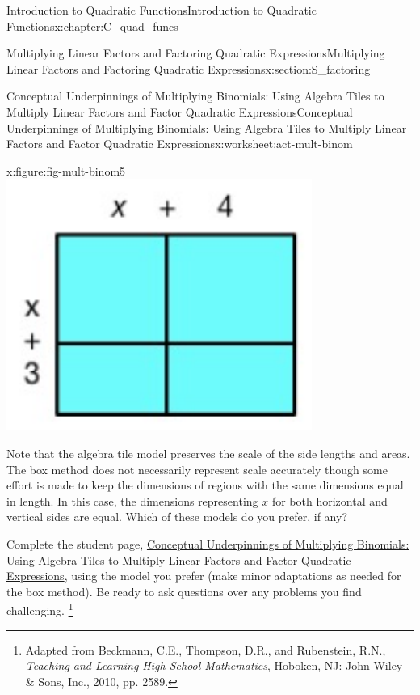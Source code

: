 \documentclass[oneside,10pt,]{book}
\newcommand{\pubtitle}[1]{\textsl{#1}}
\numberwithin{equation}{chapter}
\begin{document}
\begin{chapterptx}{Introduction to Quadratic Functions}{}{Introduction to Quadratic Functions}{}{}{x:chapter:C_quad_funcs}
\begin{sectionptx}{Multiplying Linear Factors and Factoring Quadratic Expressions}{}{Multiplying Linear Factors and Factoring Quadratic Expressions}{}{}{x:section:S_factoring}
\begin{worksheet-subsection}{Conceptual Underpinnings of Multiplying Binomials: Using Algebra Tiles to Multiply Linear Factors and Factor Quadratic Expressions}{}{Conceptual Underpinnings of Multiplying Binomials: Using Algebra Tiles to Multiply Linear Factors and Factor Quadratic Expressions}{}{}{x:worksheet:act-mult-binom}
\begin{introduction}{}
\begin{sidebyside}{2}{0}{0}{0}
\begin{sbspanel}{0.5}
\begin{figureptx}{}{x:figure:fig-mult-binom5}{}
\includegraphics[width=\linewidth]{external/mult-binom5.pdf}
\tcblower
\end{figureptx}%
\end{sbspanel}%
\end{sidebyside}%
%
\par
Note that the algebra tile model preserves the scale of the side lengths and areas. The box method does not necessarily represent scale accurately though some effort is made to keep the dimensions of regions with the same dimensions equal in length. In this case, the dimensions representing \(x\) for both horizontal and vertical sides are equal. Which of these models do you prefer, if any?%
\par
Complete the student page, \hyperref[x:worksheet:act-mult-binom]{Conceptual Underpinnings of Multiplying Binomials: Using Algebra Tiles to Multiply Linear Factors and Factor Quadratic Expressions}, using the model you prefer (make minor adaptations as needed for the box method). Be ready to ask questions over any problems you find challenging. \footnote{Adapted from Beckmann, C.E., Thompson, D.R., and Rubenstein, R.N., \pubtitle{Teaching and Learning High School Mathematics}, Hoboken, NJ: John Wiley \& Sons, Inc., 2010, pp. 258\textemdash{}9.\label{g:fn:idp1876148568}}%
\par

\end{introduction}
\end{worksheet-subsection}
\end{sectionptx}
\end{chapterptx}
\end{document}

